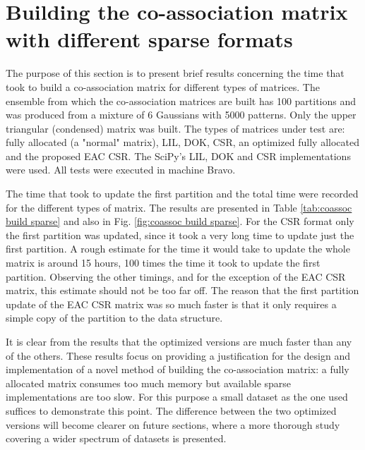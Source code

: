 \section{Building the co-association matrix with different sparse formats}
\label{sec:spare building}

The purpose of this section is to present brief results concerning the time that took to build a co-association matrix for different types of matrices.
The ensemble from which the co-association matrices are built has 100 partitions and was produced from a mixture of 6 Gaussians with 5000 patterns.
Only the upper triangular (condensed) matrix was built.
The types of matrices under test are: fully allocated (a "normal" matrix), LIL, DOK, CSR, an optimized fully allocated and the proposed EAC CSR.
The SciPy's LIL, DOK and CSR implementations were used.
All tests were executed in machine Bravo.

The time that took to update the first partition and the total time were recorded for the different types of matrix.
The results are presented in Table \ref{tab:coassoc build sparse} and also in Fig. \ref{fig:coassoc build sparse}.
For the CSR format only the first partition was updated, since it took a very long time to update just the first partition.
A rough estimate for the time it would take to update the whole matrix is around 15 hours, 100 times the time it took to update the first partition.
Observing the other timings, and for the exception of the EAC CSR matrix, this estimate should not be too far off.
The reason that the first partition update of the EAC CSR matrix was so much faster is that it only requires a simple copy of the partition to the data structure.

It is clear from the results that the optimized versions are much faster than any of the others.
These results focus on providing a justification for the design and implementation of a novel method of building the co-association matrix: a fully allocated matrix consumes too much memory but available sparse implementations are too slow.
For this purpose a small dataset as the one used suffices to demonstrate this point.
The difference between the two optimized versions will become clearer on future sections, where a more thorough study covering a wider spectrum of datasets is presented. 


